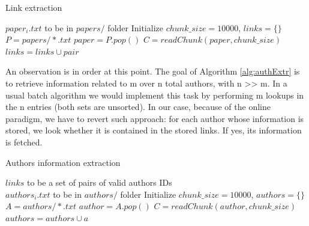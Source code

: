 \documentclass[sigchi]{acmart}
\begin{document}
\begin{algorithm} \caption{Link extraction}\label{alg:linkExtr}
\begin{algorithmic}[1]
\Require $paper_i.txt$ to be in $papers/$ folder
\State Initialize $chunk\_size = 10000$, $links = \{\}$
\State $P = papers/*.txt$
\Repeat
    \State $paper = P.pop()$
    \Repeat 
        \State $C=readChunk(paper, chunk\_size)$
                        \State $links = links \cup pair$
                    \EndFor
            \EndIf
        \EndFor
\end{algorithmic}
\end{algorithm}

An observation is in order at this point. The goal of Algorithm \ref{alg:authExtr} is to retrieve information related to m over n total authors, with n >> m.
In a usual batch algorithm we would implement this task by performing m lookups in the n entries (both sets are unsorted). In our case, because of the online paradigm, we have to revert such approach: for each author whose information is stored, we look whether it is contained in the stored links. If yes, its information is fetched.

\begin{algorithm} \caption{Authors information extraction}\label{alg:authExtr}
\begin{algorithmic}[1]
\Require $links$ to be a set of pairs of valid authors IDs \\ 
        $authors_i.txt$ to be in $authors/$ folder
\State Initialize $chunk\_size = 10000$, $authors = \{\}$
\State $A = authors/*.txt$
\Repeat
    \State $author = A.pop()$
    \Repeat 
        \State $C=readChunk(author, chunk\_size)$
                \State $authors = authors \cup a$
            \EndIf
        \EndFor
\end{algorithmic}
\end{algorithm}
\end{document}
